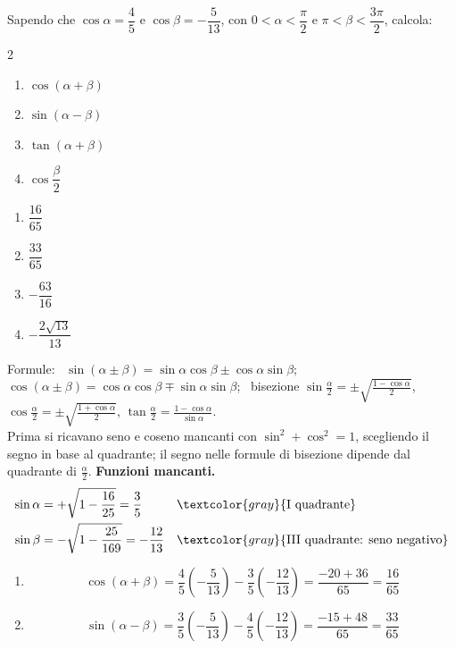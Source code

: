 \begin{question}[ID=1.2, subtitle={Formule di addizione con $\cos\alpha=4/5$ e $\cos\beta=-5/13$}, tags={goniometria, formule di addizione}, difficulty=media]
Sapendo che $\cos \alpha = \dfrac{4}{5}$ e $\cos \beta = -\dfrac{5}{13}$, con $0 < \alpha < \dfrac{\pi}{2}$ e $\pi < \beta < \dfrac{3\pi}{2}$, calcola:
\begin{multicols}{2}
\begin{enumerate}
\item $\cos(\alpha + \beta)$
\item $\sin(\alpha - \beta)$
\item $\tan(\alpha + \beta)$
\item $\cos\dfrac{\beta}{2}$
\end{enumerate}
\end{multicols}
\begin{solution}
\begin{enumerate}
    \item $\dfrac{16}{65}$
    \item $\dfrac{33}{65}$
    \item $-\dfrac{63}{16}$
    \item $-\dfrac{2\sqrt{13}}{13}$
\end{enumerate}
\end{solution}
\begin{explanation}
Formule: \ $\sin(\alpha\pm\beta)=\sin\alpha\cos\beta\pm\cos\alpha\sin\beta$; \ $\cos(\alpha\pm\beta)=\cos\alpha\cos\beta\mp\sin\alpha\sin\beta$; \ bisezione $\sin\tfrac\alpha2=\pm\sqrt{\tfrac{1-\cos\alpha}{2}}$, $\cos\tfrac\alpha2=\pm\sqrt{\tfrac{1+\cos\alpha}{2}}$, $\tan\tfrac\alpha2=\tfrac{1-\cos\alpha}{\sin\alpha}$. \\
Prima si ricavano seno e coseno mancanti con $\sin^2+\cos^2=1$, scegliendo il segno in base al quadrante; il segno nelle formule di bisezione dipende dal quadrante di $\tfrac\alpha2$.
\textbf{Funzioni mancanti.}
\[\begin{aligned}
\sin\alpha &= +\sqrt{1-\dfrac{16}{25}}=\dfrac35 && \textcolor{gray}{\text{I quadrante}}\\
\sin\beta &= -\sqrt{1-\dfrac{25}{169}}=-\dfrac{12}{13} && \textcolor{gray}{\text{III quadrante: seno negativo}}
\end{aligned}\]
\begin{enumerate}
    \item \[ \cos(\alpha+\beta)=\dfrac45\left(-\dfrac5{13}\right)-\dfrac35\left(-\dfrac{12}{13}\right)=\dfrac{-20+36}{65}=\dfrac{16}{65} \]
    \item \[ \sin(\alpha-\beta)=\dfrac35\left(-\dfrac5{13}\right)-\dfrac45\left(-\dfrac{12}{13}\right)=\dfrac{-15+48}{65}=\dfrac{33}{65} \]

\end{enumerate}
\end{explanation}
\end{question}
